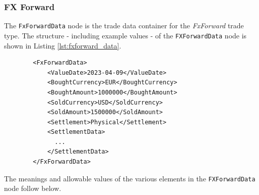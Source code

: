 \subsubsection{FX Forward}

\ifdefined{}\fi

The \lstinline!FxForwardData!  node is the trade data container for the \emph{FxForward} trade type.  The structure -
including example values - of the \lstinline!FXForwardData!  node is shown in Listing \ref{lst:fxforward_data}.

\begin{listing}[H]
\begin{verbatim}
        <FxForwardData>
            <ValueDate>2023-04-09</ValueDate>
            <BoughtCurrency>EUR</BoughtCurrency>
            <BoughtAmount>1000000</BoughtAmount>
            <SoldCurrency>USD</SoldCurrency>
            <SoldAmount>1500000</SoldAmount>
            <Settlement>Physical</Settlement>
            <SettlementData>
              ...
            </SettlementData>
        </FxForwardData>
\end{verbatim}
\caption{FX Forward data}
\label{lst:fxforward_data}
\end{listing}

The meanings and allowable values of the various elements in the \lstinline!FXForwardData!  node follow below.

